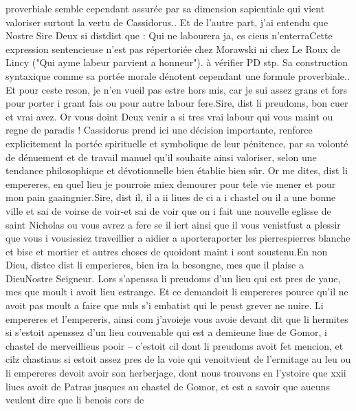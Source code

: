 \documentclass{article}
\begin{document}
\begin{pages}
      proverbiale semble cependant assurée par sa dimension sapientiale qui vient valoriser surtout la vertu de Cassidorus.. 
      Et de l’autre part, j’ai entendu que Nostre Sire Deux si distdist que : 
      Qui ne labourera ja, es cieus n’enterraCette 
         expression sentencieuse n'est pas répertoriée chez Morawski ni chez Le Roux de Lincy ("Qui ayme labeur parvient a honneur"). 
         à vérifier PD stp. Sa construction
         syntaxique comme sa portée morale dénotent cependant une formule proverbiale.. 
      Et pour ceste reson, je n’en vueil pas estre hors mis, car je sui assez grans 
      et fors pour porter i grant fais ou pour autre labour fere.Sire, dist li preudoms, bon cuer et vrai avez. 
   Or vous doint Deux venir a si tres vrai labour qui vous maint ou regne de paradis !
   Cassidorus prend ici une décision importante, renforce explicitement la portée spirituelle et symbolique 
      de leur pénitence, par sa volonté de dénuement et de travail manuel qu'il souhaite ainsi valoriser, selon une tendance 
   philosophique et dévotionnelle bien établie bien sûr. \pend
\pstart Or me dites, dist li empereres, en 
   quel lieu je pourroie miex demourer pour tele vie mener et pour mon pain gaaingnier.Sire, dist il, il a ii liues de ci a 
      i chastel ou 
      il a une bonne ville et sai de voirse de voir-et sai de voir que on 
      i fait une nouvelle eglisse de saint Nicholas 
      ou vous avrez a fere se il iert 
      ainsi que il vous venistfust a plessir que vous i vousissiez traveillier 
      a aidier a aporteraporter les 
      pierrespierres blanche et bise et mortier 
      et autres choses de quoidont maint i sont soustenu.En non Dieu, distce dist 
      li emperieres, bien ira la besongne, mes que il plaise a 
      DieuNostre Seigneur.
   Lors s’apenssa li preudoms d’un lieu qui est pres de yaue, 
   mes que moult i avoit lieu estrange. Et ce demandoit li empereres pource qu’il ne avoit pas moult 
   a faire que nuls s’i embatist qui le peust grever ne nuire. \pend
\pstart Li empereres et l’empereris, 
   ainsi com j’avoieje vous avoie devant dit que
   li hermites si s’estoit apenssez d’un lieu couvenable 
   qui est a demieune liue de Gomor, 
   i chastel de merveillieus pooir – c’estoit cil dont li preudoms avoit fet mencion,
   et cilz chastiaus si estoit assez pres de la voie qui 
   venoitvient de l’ermitage au
   leu ou li empereres devoit avoir son herberjage, 
   dont nous trouvons en l’ystoire que xxii liues avoit de Patras 
   jusques au chastel de Gomor, 
   et est a savoir que aucuns veulent dire que li benois cors de 

\end{pages}
\end{document}
